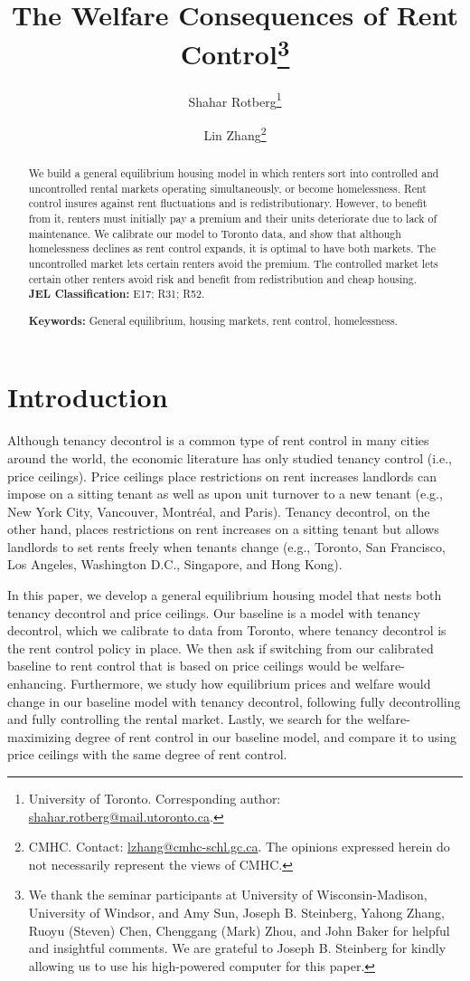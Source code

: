\documentclass[parskip=full]{article}
\author{Shahar Rotberg\footnote{University of Toronto. Corresponding author: \url{shahar.rotberg@mail.utoronto.ca}.} \and Lin Zhang\footnote{CMHC. Contact: \url{lzhang@cmhc-schl.gc.ca}. The opinions expressed herein do not necessarily represent the views of CMHC.}}
\title{\vspace{-1.8cm}The Welfare Consequences of Rent Control\footnote{We thank the seminar participants at University of Wisconsin-Madison, University of Windsor, and Amy Sun, Joseph B. Steinberg, Yahong Zhang, Ruoyu (Steven) Chen, Chenggang (Mark) Zhou, and John Baker for helpful and insightful comments. We are grateful to Joseph B. Steinberg for kindly allowing us to use his high-powered computer for this paper.}}
\begin{document}
\maketitle

\begin{abstract}
\onehalfspacing
\noindent We build a general equilibrium housing model in which renters sort into controlled and uncontrolled rental markets operating simultaneously, or become homelessness. Rent control insures against rent fluctuations and is redistributionary. However, to benefit from it, renters must initially pay a premium and their units deteriorate due to lack of maintenance. We calibrate our model to Toronto data, and show that although homelessness declines as rent control expands, it is optimal to have both markets. The uncontrolled market lets certain renters avoid the premium. The controlled market lets certain other renters avoid risk and benefit from redistribution and cheap housing.
\\[1.5ex]

\noindent \textbf{JEL Classification:} E17; R31; R52. 

\noindent \textbf{Keywords:} General equilibrium, housing markets, rent control, homelessness.
\end{abstract}

\section{Introduction}

Although tenancy decontrol is a common type of rent control in many cities around the world, the economic literature has only studied tenancy control (i.e., price ceilings). Price ceilings place restrictions on rent increases landlords can impose on a sitting tenant as well as upon unit turnover to a new tenant (e.g., New York City, Vancouver, Montréal, and Paris). Tenancy decontrol, on the other hand, places restrictions on rent increases on a sitting tenant but allows landlords to set rents freely when tenants change (e.g., Toronto, San Francisco, Los Angeles, Washington D.C., Singapore, and Hong Kong). 

In this paper, we develop a general equilibrium housing model that nests both tenancy decontrol and price ceilings. Our baseline is a model with tenancy decontrol, which we calibrate to data from Toronto, where tenancy decontrol is the rent control policy in place. We then ask if switching from our calibrated baseline to rent control that is based on price ceilings would be welfare-enhancing. Furthermore, we study how equilibrium prices and welfare would change in our baseline model with tenancy decontrol, following fully decontrolling and fully controlling the rental market. Lastly, we search for the welfare-maximizing degree of rent control in our baseline model, and compare it to using price ceilings with the same degree of rent control. 
\end{document}
